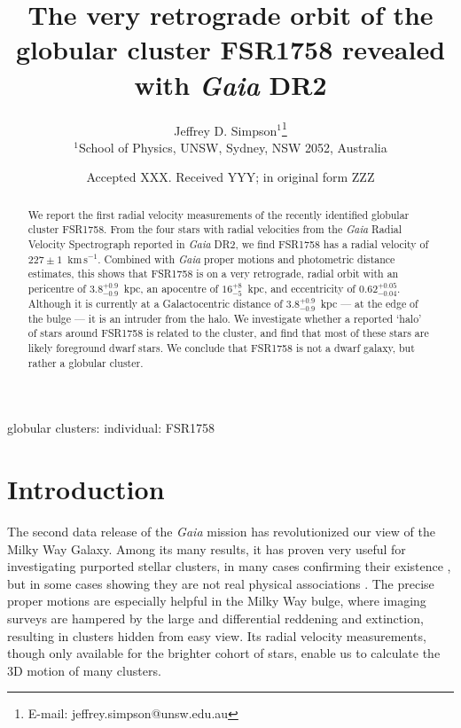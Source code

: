 \documentclass[fleqn,usenatbib,letters]{mnras}
\title[The orbit of FSR1758]{The very retrograde orbit of the globular cluster FSR1758 revealed with \textit{Gaia} DR2}
\author[Simpson]{
Jeffrey D. Simpson$^{1}$\thanks{E-mail: jeffrey.simpson@unsw.edu.au}
\\
$^{1}$School of Physics, UNSW, Sydney, NSW 2052, Australia
}
\date{Accepted XXX. Received YYY; in original form ZZZ}
\newcommand{\kms}{~\ensuremath{\textrm{km}\,\textrm{s}^{-1}}}
\begin{document}
\label{firstpage}
\pagerange{\pageref{firstpage}--\pageref{lastpage}}
\maketitle

\begin{abstract}
We report the first radial velocity measurements of the recently identified globular cluster FSR1758. From the four stars with radial velocities from the \textit{Gaia} Radial Velocity Spectrograph reported in \textit{Gaia} DR2, we find FSR1758 has a radial velocity of $227\pm1$\kms. Combined with \textit{Gaia} proper motions and photometric distance estimates, this shows that FSR1758 is on a very retrograde, radial orbit with an pericentre of $3.8_{-0.9}^{+0.9}$~kpc, an apocentre of $16_{-5}^{+8}$~kpc, and eccentricity of $0.62_{-0.04}^{+0.05}$. Although it is currently at a Galactocentric distance of $3.8_{-0.9}^{+0.9}$~kpc --- at the edge of the bulge --- it is an intruder from the halo. We investigate whether a reported `halo' of stars around FSR1758 is related to the cluster, and find that most of these stars are likely foreground dwarf stars. We conclude that FSR1758 is not a dwarf galaxy, but rather a globular cluster.
\end{abstract}

\begin{keywords}
globular clusters: individual: FSR1758
\end{keywords}



\section{Introduction} \label{sec:intro}
The second data release of the \textit{Gaia} mission \citep{GaiaCollaboration:2018io} has revolutionized our view of the Milky Way Galaxy. Among its many results, it has proven very useful for investigating purported stellar clusters, in many cases confirming their existence \citep[e.g.,][]{Simpson:2017ex,Soubiran2018,Cantat-Gaudin2018}, but in some cases showing they are not real physical associations \citep[e.g.,][]{Kos:2018we}. The precise proper motions are especially helpful in the Milky Way bulge, where imaging surveys are hampered by the large and differential reddening and extinction, resulting in clusters hidden from easy view. Its radial velocity measurements, though only available for the brighter cohort of stars, enable us to calculate the 3D motion of many clusters.
\end{document}
